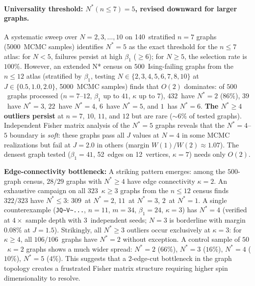 \documentclass[11pt]{article}
\theoremstyle{definition}
\theoremstyle{remark}
\begin{document}
\paragraph{Universality threshold: $N^*(n \leq 7) = 5$, revised downward for larger graphs.}
A systematic sweep over $N = 2, 3, \ldots, 10$ on 140~stratified $n = 7$
graphs (5000~MCMC samples) identifies $N^* = 5$ as the exact threshold for
the $n \leq 7$ atlas: for $N < 5$, failures persist at high
$\beta_1$ ($\geq 6$); for $N \geq 5$, the selection rate is $100\%$.
However, an extended N* census on $500$~Ising-failing graphs from the
$n \leq 12$ atlas (stratified by $\beta_1$, testing $N \in \{2,3,4,5,6,7,8,10\}$
at $J \in \{0.5, 1.0, 2.0\}$, 5000~MCMC samples) finds that $O(2)$ dominates:
of $500$~graphs processed ($n = 7$--$12$, $\beta_1$ up
to $41$, $\kappa$ up to $7$), $432$~have $N^* = 2$ ($86\%$), $39$~have $N^* = 3$,
$22$~have $N^* = 4$, $6$~have $N^* = 5$, and $1$~has $N^* = 6$.
\textbf{The $N^* \geq 4$ outliers persist} at $n = 7$, $10$, $11$, and $12$
but are rare (${\sim}6\%$ of tested graphs).
Independent Fisher matrix analysis of the $N^* = 5$ graphs reveals that
the $N^* = 4$--$5$ boundary is \emph{soft}: these graphs pass all $J$ values
at $N = 4$ in some MCMC realizations but fail at $J = 2.0$ in others
(margin $W(1)/W(2) \approx 1.07$).
The densest graph tested ($\beta_1 = 41$, 52~edges on 12~vertices,
$\kappa = 7$) needs only $O(2)$.

\textbf{Edge-connectivity bottleneck:} A striking pattern emerges:
among the $500$-graph census, $28/29$ graphs with $N^* \geq 4$ have
edge connectivity $\kappa = 2$. An exhaustive campaign on all
$323$~$\kappa \geq 3$ graphs from the $n \leq 12$ census finds
$322/323$ have $N^* \leq 3$: $309$~at $N^* = 2$, $11$~at $N^* = 3$,
$2$~at $N^* = 1$. A single counterexample (\texttt{JQ\~{}V\~{}...},
$n = 11$, $m = 34$, $\beta_1 = 24$, $\kappa = 3$) has $N^* = 4$
(verified at $4\times$ sample depth with $3$~independent seeds;
$N = 3$ is borderline with margin~$0.08\%$ at $J = 1.5$).
Strikingly, all $N^* \geq 3$ outliers occur exclusively at $\kappa = 3$:
for $\kappa \geq 4$, all $106/106$~graphs have $N^* = 2$ without exception.
A control sample of $50$~$\kappa = 2$ graphs shows a much wider spread:
$N^* = 2$ ($66\%$), $N^* = 3$ ($16\%$), $N^* = 4$ ($10\%$), $N^* = 5$ ($4\%$).
This suggests that
a $2$-edge-cut bottleneck in the graph topology creates a frustrated
Fisher matrix structure requiring higher spin dimensionality to resolve.
\end{document}
